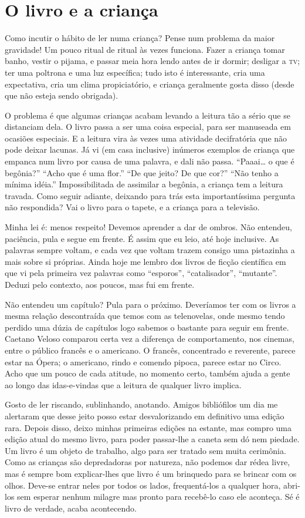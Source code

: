 \chapter{O livro e a criança}

Como incutir o hábito de ler numa criança? Pense num problema da maior
gravidade! Um pouco ritual de ritual às vezes funciona. Fazer a
criança tomar banho, vestir o pijama, e passar meia hora lendo antes
de ir dormir; desligar a \textsc{tv}; ter uma poltrona e uma luz específica;
tudo isto é interessante, cria uma expectativa, cria um clima
propiciatório, e criança geralmente gosta disso (desde que não esteja
sendo obrigada).

O problema é que algumas crianças acabam levando a leitura tão a sério
que se distanciam dela. O livro passa a ser uma coisa especial, para
ser manuseada em ocasiões especiais. E a leitura vira às vezes uma
atividade decifratória que não pode deixar lacunas. Já vi (em casa
inclusive) inúmeros exemplos de criança que empanca num livro por
causa de uma palavra, e dali não passa. “Paaai… o que é begônia?”
“Acho que é uma flor.” “De que jeito? De que cor?” “Não tenho a
mínima idéia.” Impossibilitada de assimilar a begônia, a criança tem
a leitura travada. Como seguir adiante, deixando para trás esta
importantíssima pergunta não respondida? Vai o livro para o tapete, e
a criança para a televisão.

Minha lei é: menos respeito! Devemos aprender a dar de ombros. Não
entendeu, paciência, pula e segue em frente. É assim que eu leio, até
hoje inclusive. As palavras sempre voltam, e cada vez que voltam
trazem consigo uma pistazinha a mais sobre si próprias. Ainda hoje me
lembro dos livros de ficção científica em que vi pela primeira vez
palavras como “esporos”, “catalisador”, “mutante”. Deduzi pelo
contexto, aos poucos, mas fui em frente. 

Não entendeu um capítulo? Pula para o próximo. Deveríamos ter com os
livros a mesma relação descontraída que temos com as telenovelas,
onde mesmo tendo perdido uma dúzia de capítulos logo sabemos o
bastante para seguir em frente. Caetano Veloso comparou certa vez a
diferença de comportamento, nos cinemas, entre o público francês e o
americano. O francês, concentrado e reverente, parece estar na Ópera;
o americano, rindo e comendo pipoca, parece estar no Circo.  Acho que
um pouco de cada atitude, no momento certo, também ajuda a gente ao
longo das idas-e-vindas que a leitura de qualquer livro implica.

Gosto de ler riscando, sublinhando, anotando. Amigos bibliófilos um
dia me alertaram que desse jeito posso estar desvalorizando em
definitivo uma edição rara. Depois disso, deixo minhas primeiras
edições na estante, mas compro uma edição atual do mesmo livro, para
poder passar-lhe a caneta sem dó nem piedade. Um livro é um objeto de
trabalho, algo para ser tratado sem muita cerimônia. Como as crianças
são depredadoras por natureza, não podemos dar rédea livre, mas é
sempre bom explicar-lhes que livro é um brinquedo para se brincar com
os olhos. Deve-se entrar neles por todos os lados, frequentá-los a
qualquer hora, abri-los sem esperar nenhum milagre mas pronto para
recebê-lo caso ele aconteça. Sé é livro de verdade, acaba
acontecendo.

